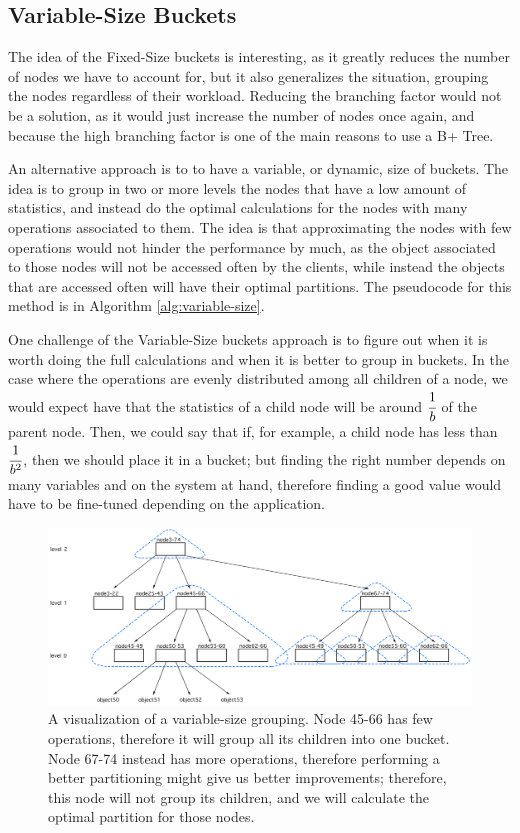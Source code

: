\subsection{Variable-Size Buckets}\label{sec:Variable-Size buckets}
The idea of the Fixed-Size buckets is interesting, as it greatly reduces the number of nodes we have to account for, but it also generalizes the situation, grouping the nodes regardless of their workload. Reducing the branching factor would not be a solution, as it would just increase the number of nodes once again, and because the high branching factor is one of the main reasons to use a B+ Tree. 

An alternative approach is to to have a variable, or dynamic, size of buckets. The idea is to group in two or more levels the nodes that have a low amount of statistics, and instead do the optimal calculations for the nodes with many operations associated to them. The idea is that approximating the nodes with few operations would not hinder the performance by much, as the object associated to those nodes will not be accessed often by the clients, while instead the objects that are accessed often will have their optimal partitions. 
The pseudocode for this method is in Algorithm \ref{alg:variable-size}.


One challenge of the Variable-Size buckets approach is to figure out when it is worth doing the full calculations and when it is better to group in buckets. In the case where the operations are evenly distributed among all children of a node, we would expect have that the statistics of a child node will be around $\cfrac{1}{b}$ of the parent node. Then, we could say that if, for example, a child node has less than $\cfrac{1}{b^2}$, then we should place it in a bucket; but finding the right number depends on many variables and on the system at hand, therefore finding a good value would have to be fine-tuned depending on the application.

\begin{figure}[!htb]
  \centering
  \includegraphics[width=\textwidth,height=\textheight,keepaspectratio]{img/dynamic-buckets.png}
  \caption[caption]{ A visualization of a variable-size grouping. Node 45-66 has few operations, therefore it will group all its children into one bucket. Node 67-74 instead has more operations, therefore performing a better partitioning might give us better improvements; therefore, this node will not group its children, and we will calculate the optimal partition for those nodes. }
  \label{fig:Variable-Size-buckets}
\end{figure}

